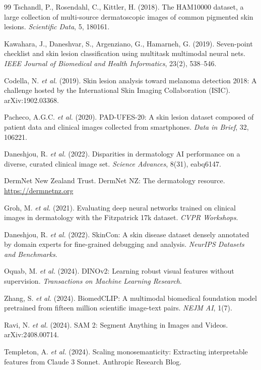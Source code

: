 \begin{thebibliography}{99}
Tschandl, P., Rosendahl, C., Kittler, H. (2018). The HAM10000 dataset, a large collection of multi-source dermatoscopic images of common pigmented skin lesions. \emph{Scientific Data}, 5, 180161.

Kawahara, J., Daneshvar, S., Argenziano, G., Hamarneh, G. (2019). Seven-point checklist and skin lesion classification using multitask multimodal neural nets. \emph{IEEE Journal of Biomedical and Health Informatics}, 23(2), 538--546.

Codella, N. \emph{et al.} (2019). Skin lesion analysis toward melanoma detection 2018: A challenge hosted by the International Skin Imaging Collaboration (ISIC). arXiv:1902.03368.

Pacheco, A.G.C. \emph{et al.} (2020). PAD-UFES-20: A skin lesion dataset composed of patient data and clinical images collected from smartphones. \emph{Data in Brief}, 32, 106221.

Daneshjou, R. \emph{et al.} (2022). Disparities in dermatology AI performance on a diverse, curated clinical image set. \emph{Science Advances}, 8(31), eabq6147.

DermNet New Zealand Trust. DermNet NZ: The dermatology resource. \url{https://dermnetnz.org}

Groh, M. \emph{et al.} (2021). Evaluating deep neural networks trained on clinical images in dermatology with the Fitzpatrick 17k dataset. \emph{CVPR Workshops}.

Daneshjou, R. \emph{et al.} (2022). SkinCon: A skin disease dataset densely annotated by domain experts for fine-grained debugging and analysis. \emph{NeurIPS Datasets and Benchmarks}.

Oquab, M. \emph{et al.} (2024). DINOv2: Learning robust visual features without supervision. \emph{Transactions on Machine Learning Research}.

Zhang, S. \emph{et al.} (2024). BiomedCLIP: A multimodal biomedical foundation model pretrained from fifteen million scientific image-text pairs. \emph{NEJM AI}, 1(7).

Ravi, N. \emph{et al.} (2024). SAM 2: Segment Anything in Images and Videos. arXiv:2408.00714.

Templeton, A. \emph{et al.} (2024). Scaling monosemanticity: Extracting interpretable features from Claude 3 Sonnet. Anthropic Research Blog.


\end{thebibliography}
